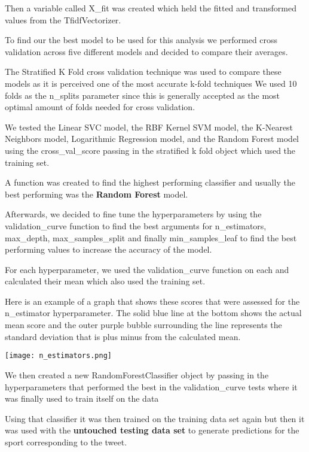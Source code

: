 \documentclass{article}
\begin{document}
\begin{enumerate}
    Then a variable called X\_fit was created which held the fitted and transformed values from the TfidfVectorizer.

    To find our the best model to be used for this analysis we performed cross validation across five different models and decided to compare their averages. 


    The Stratified K Fold cross validation technique was used to compare these models as it is perceived one of the most accurate k-fold techniques We used 10 folds as the n\_splits parameter since this is generally accepted as the most optimal amount of folds needed for cross validation.

    We tested the Linear SVC model, the RBF Kernel SVM model, the K-Nearest Neighbors model, Logarithmic Regression model, and the Random Forest model using the cross\_val\_score passing in the stratified k fold object which used the training set.

    A function was created to find the highest performing classifier and usually the best performing was the \textbf{Random Forest} model. 

    Afterwards, we decided to fine tune the hyperparameters by using the validation\_curve function to find the best arguments for n\_estimators, max\_depth, max\_samples\_split and finally min\_samples\_leaf to find the best performing values to increase the accuracy of the model.

    \indent For each hyperparameter, we used the validation\_curve function on each and calculated their mean which also used the training set.

    Here is an example of a graph that shows these scores that were assessed for the n\_estimator hyperparameter. The solid blue line at the bottom shows the actual mean score and the outer purple bubble surrounding the line represents the standard deviation that is plus minus from the calculated mean. 

    \texttt{[image: n\_estimators.png]}

    We then created a new RandomForestClassifier object by passing in the hyperparameters that performed the best in the validation\_curve tests where it was finally used to train itself on the data

    Using that classifier it was then trained on the training data set again but then it was used with the \textbf{untouched testing data set} to generate predictions for the sport corresponding to the tweet.
    
\end{enumerate}
\end{document}
